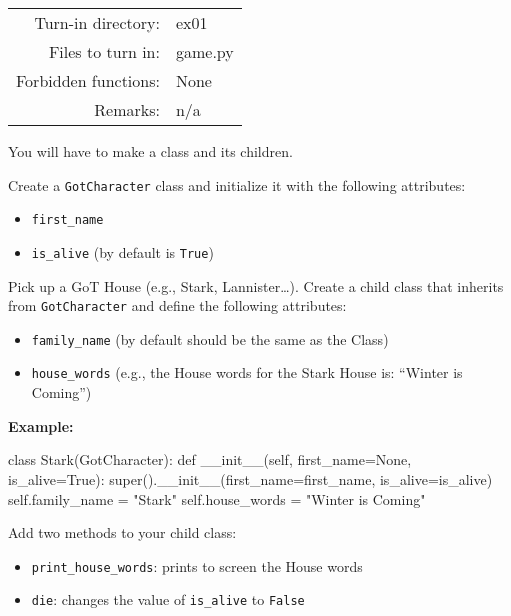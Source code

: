 \documentclass[]{article}
\newenvironment{Shaded}{\begin{snugshade}}{\end{snugshade}}
\newcommand{\BuiltInTok}[1]{\textcolor[rgb]{0.50,0.55,0.55}{#1}}
\newcommand{\FunctionTok}[1]{\textcolor[rgb]{0.56,0.27,0.68}{#1}}
\newcommand{\KeywordTok}[1]{\textcolor[rgb]{0.81,0.81,0.76}{#1}}
\newcommand{\NormalTok}[1]{\textcolor[rgb]{0.81,0.81,0.76}{#1}}
\newcommand{\OperatorTok}[1]{\textcolor[rgb]{0.81,0.81,0.76}{#1}}
\newcommand{\StringTok}[1]{\textcolor[rgb]{0.96,0.31,0.31}{#1}}
\newcommand{\VariableTok}[1]{\textcolor[rgb]{0.15,0.68,0.68}{#1}}
\begin{document}
\begin{longtable}[]{@{}rl@{}}
\toprule
\endhead
Turn-in directory: & ex01\tabularnewline
Files to turn in: & game.py\tabularnewline
Forbidden functions: & None\tabularnewline
Remarks: & n/a\tabularnewline
\bottomrule
\end{longtable}

You will have to make a class and its children.

Create a \texttt{GotCharacter} class and initialize it with the
following attributes:

\begin{itemize}
\item
  \texttt{first\_name}
\item
  \texttt{is\_alive} (by default is \texttt{True})
\end{itemize}

Pick up a GoT House (e.g., Stark, Lannister\ldots{}). Create a child
class that inherits from \texttt{GotCharacter} and define the following
attributes:

\begin{itemize}
\item
  \texttt{family\_name} (by default should be the same as the Class)
\item
  \texttt{house\_words} (e.g., the House words for the Stark House is:
  ``Winter is Coming'')
\end{itemize}

\textbf{Example:}

\begin{Shaded}
\begin{Highlighting}[]
\KeywordTok{class}\NormalTok{ Stark(GotCharacter):}
    \KeywordTok{def} \FunctionTok{__init__}\NormalTok{(}\VariableTok{self}\NormalTok{, first_name}\OperatorTok{=}\VariableTok{None}\NormalTok{, is_alive}\OperatorTok{=}\VariableTok{True}\NormalTok{):}
        \BuiltInTok{super}\NormalTok{().}\FunctionTok{__init__}\NormalTok{(first_name}\OperatorTok{=}\NormalTok{first_name, is_alive}\OperatorTok{=}\NormalTok{is_alive)}
        \VariableTok{self}\NormalTok{.family_name }\OperatorTok{=} \StringTok{"Stark"}
        \VariableTok{self}\NormalTok{.house_words }\OperatorTok{=} \StringTok{"Winter is Coming"}
\end{Highlighting}
\end{Shaded}

Add two methods to your child class:

\begin{itemize}
\item
  \texttt{print\_house\_words}: prints to screen the House words
\item
  \texttt{die}: changes the value of \texttt{is\_alive} to
  \texttt{False}
\end{itemize}
\end{document}
